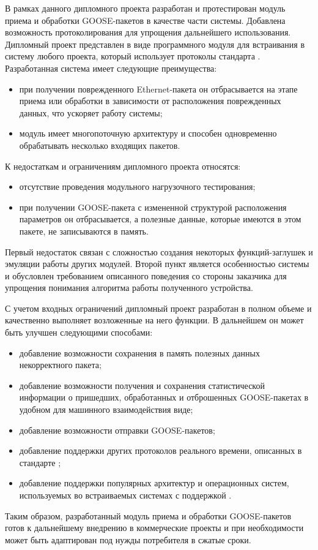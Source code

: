 \label{sec:outro}

В рамках данного дипломного проекта разработан и протестирован модуль приема и обработки GOOSE-пакетов в качестве части системы. Добавлена возможность протоколирования для упрощения дальнейшего использования.
Дипломный проект представлен в виде программного модуля для встраивания в систему любого проекта, который использует протоколы стандарта \iecStd. Разработанная система имеет следующие преимущества:

\begin{itemize}
    \item при получении поврежденного Ethernet-пакета он отбрасывается на этапе приема или обработки в зависимости от расположения поврежденных данных, что ускоряет работу системы;
    \item модуль имеет многопоточную архитектуру и способен одновременно обрабатывать несколько входящих пакетов.
\end{itemize}

К недостаткам и ограничениям дипломного проекта относятся:

\begin{itemize}
    \item отсутствие проведения модульного нагрузочного тестирования;
    \item при получении GOOSE-пакета с измененной структурой расположения параметров он отбрасывается, а полезные данные, которые имеются в этом пакете, не записываются в память.
\end{itemize}

Первый недостаток связан с сложностью создания некоторых функций-заглушек и эмуляции
работы других модулей.
Второй пункт является особенностью системы и обусловлен требованием описанного
поведения со стороны заказчика для упрощения понимания алгоритма работы полученного
устройства.

С учетом входных ограничений дипломный проект разработан в
полном объеме и качественно выполняет возложенные на него функции. В
дальнейшем он может быть улучшен следующими способами:

\begin{itemize}
    \item добавление возможности сохранения в память полезных данных некорректного пакета;
    \item добавление возможности получения и сохранения статистической информации о пришедших, обработанных и отброшенных GOOSE-пакетах в удобном для машинного взаимодействия виде;
    \item добавление возможности отправки GOOSE-пакетов;
    \item добавление поддержки других протоколов реального времени, описанных
    в стандарте \iecStd;
    \item добавление поддержки популярных архитектур и операционных систем,
    используемых во встраиваемых системах с поддержкой \iecStd.
\end{itemize}

Таким образом, разработанный модуль приема и обработки GOOSE-пакетов готов к дальнейшему внедрению в коммерческие проекты и при необходимости может быть адаптирован под нужды потребителя в сжатые сроки.
